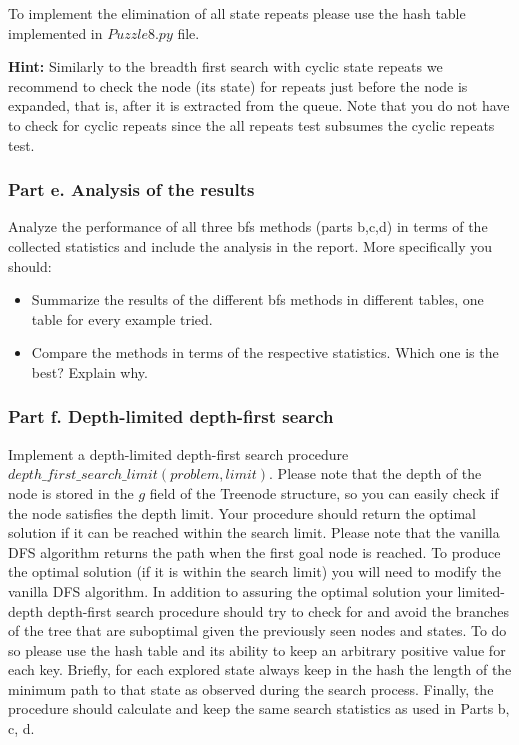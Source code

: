 \documentclass[11pt]{article}
\begin{document}
To implement the elimination of all state repeats please use the hash table implemented in $Puzzle8.py$ file.  

{\bf Hint:} Similarly to the breadth first search with cyclic state repeats we recommend to check the node (its
state) for repeats just before the node is expanded, that is, after it
is extracted from the queue. Note that you do not have to check for cyclic
repeats since the all repeats test subsumes the cyclic repeats test. 

\subsubsection*{Part e. Analysis of the results}

Analyze the performance of all three bfs methods (parts b,c,d) in terms of the collected statistics and include the analysis in the report. More specifically you should: 
\begin{itemize}
\item Summarize the results of the different bfs methods in different tables, one table for every example tried. 
\item Compare the methods in terms of the respective statistics. Which one is the best? Explain why.
\end{itemize}


\subsubsection*{Part f. Depth-limited depth-first search} 

Implement a depth-limited depth-first search procedure $depth\_first\_search\_limit(problem, limit)$.  Please note that the depth of the node is stored in the $g$ field of the Treenode structure, so you can easily check if the node satisfies the depth limit. Your procedure should return the optimal solution if it can be reached within the search limit. Please note that the vanilla DFS algorithm returns the path when the first goal node is reached. To produce the optimal solution (if it is within the search limit) you will need to modify the vanilla DFS algorithm. In addition to assuring the optimal solution your limited-depth depth-first search procedure should try to check for and avoid the branches of the tree that are suboptimal given the previously seen nodes and states. To do so please use the hash table and its ability to keep an arbitrary positive value for each key. Briefly, for each explored state always keep in the hash the length of the minimum path to that state as observed during the search process. Finally, the procedure should calculate and keep the same search statistics as used in Parts b, c, d.  
\end{document}
